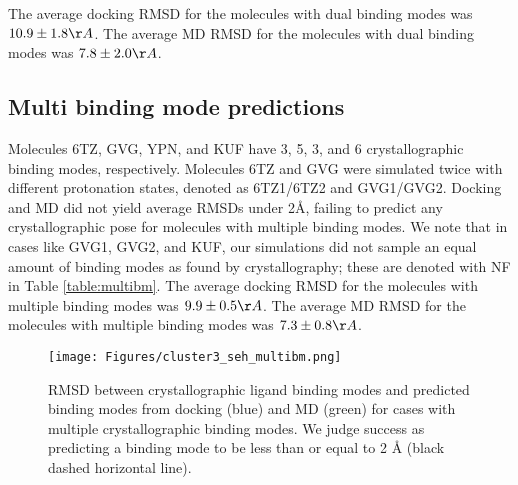 \documentclass[journal=jcisd8,manuscript=article]{achemso}
\begin{document}
The average docking RMSD for the molecules with dual binding modes was $10.9 \pm 1.8 {\AA}$.
The average MD RMSD for the molecules with dual binding modes was $7.8 \pm 2.0 {\AA}$. 

\subsection{Multi binding mode predictions}

Molecules 6TZ, GVG, YPN, and KUF have 3, 5, 3, and 6 crystallographic binding modes, respectively.
Molecules 6TZ and GVG were simulated twice with different protonation states, denoted as 6TZ1/6TZ2 and GVG1/GVG2. 
Docking and MD did not yield average RMSDs under 2{\AA}, failing to predict any crystallographic pose for molecules with multiple binding modes.
We note that in cases like GVG1, GVG2, and KUF, our simulations did not sample an equal amount of binding modes as found by crystallography; these are denoted with NF in Table \ref{table:multibm}.
The average docking RMSD for the molecules with multiple binding modes was $9.9 \pm 0.5 {\AA}$.
The average MD RMSD for the molecules with multiple binding modes was $7.3 \pm 0.8 {\AA}$. 

\begin{figure}
    \centering
    \texttt{[image: Figures/cluster3\_seh\_multibm.png]}
    \caption[SEH MD Multi Binding Mode Ligands]{RMSD between crystallographic ligand binding modes and predicted binding modes from docking (blue) and MD (green) for cases with multiple crystallographic binding modes. We judge success as predicting a binding mode to be less than or equal to 2 {\AA} (black dashed horizontal line).}
    \label{fig:rmsd-multibm}
\end{figure}
\end{document}
